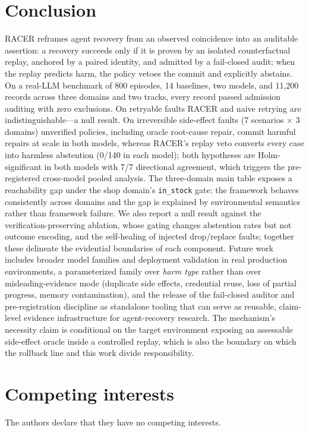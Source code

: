 \documentclass[review]{fcs}
\begin{document}
\section{Conclusion}

RACER reframes agent recovery from an observed coincidence into an auditable assertion: a recovery succeeds only if it is proven by an isolated counterfactual replay, anchored by a paired identity, and admitted by a fail-closed audit; when the replay predicts harm, the policy vetoes the commit and explicitly abstains. On a real-LLM benchmark of 800 episodes, 14 baselines, two models, and 11,200 records across three domains and two tracks, every record passed admission auditing with zero exclusions. On retryable faults RACER and naive retrying are indistinguishable---a null result. On irreversible side-effect faults (7 scenarios $\times$ 3 domains) unverified policies, including oracle root-cause repair, commit harmful repairs at scale in both models, whereas RACER's replay veto converts every case into harmless abstention (0/140 in each model); both hypotheses are Holm-significant in both models with 7/7 directional agreement, which triggers the pre-registered cross-model pooled analysis. The three-domain main table exposes a reachability gap under the shop domain's \texttt{in\_stock} gate: the framework behaves consistently across domains and the gap is explained by environmental semantics rather than framework failure. We also report a null result against the verification-preserving ablation, whose gating changes abstention rates but not outcome encoding, and the self-healing of injected drop/replace faults; together these delineate the evidential boundaries of each component. Future work includes broader model families and deployment validation in real production environments, a parameterized family over \emph{harm type} rather than over misleading-evidence mode (duplicate side effects, credential reuse, loss of partial progress, memory contamination), and the release of the fail-closed auditor and pre-registration discipline as standalone tooling that can serve as reusable, claim-level evidence infrastructure for agent-recovery research. The mechanism's necessity claim is conditional on the target environment exposing an assessable side-effect oracle inside a controlled replay, which is also the boundary on which the rollback line \cite{ref8,ref9,ref10,ref11,ref12,ref13} and this work divide responsibility.

\section*{Competing interests}
The authors declare that they have no competing interests.
\end{document}
